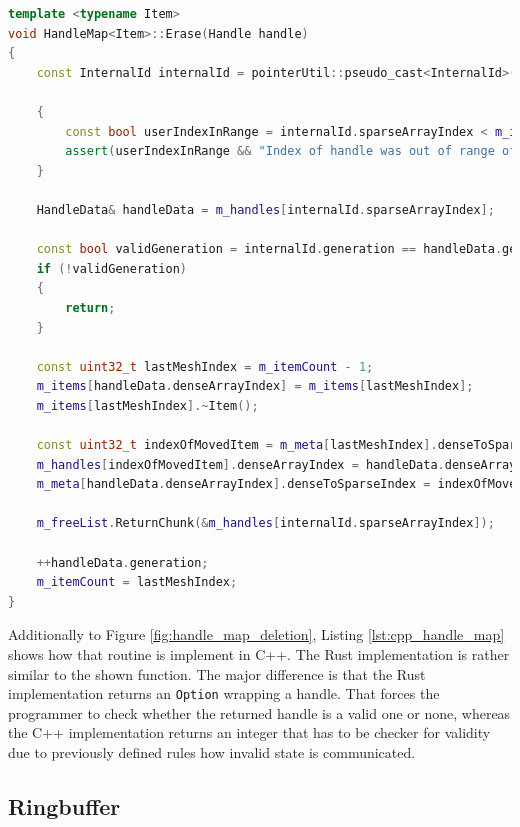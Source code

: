 \begin{lstlisting}[caption={Deletion of an item in the C++ implementation of the handle map}, label={lst:cpp_handle_map}, language={C++}]
template <typename Item>
void HandleMap<Item>::Erase(Handle handle)
{
	const InternalId internalId = pointerUtil::pseudo_cast<InternalId>(handle, 0);
	
	{
		const bool userIndexInRange = internalId.sparseArrayIndex < m_itemCount;
		assert(userIndexInRange && "Index of handle was out of range of the handle array");
	}
	
	HandleData& handleData = m_handles[internalId.sparseArrayIndex];
	
	const bool validGeneration = internalId.generation == handleData.generation;
	if (!validGeneration)
	{
		return;
	}
	
	const uint32_t lastMeshIndex = m_itemCount - 1;
	m_items[handleData.denseArrayIndex] = m_items[lastMeshIndex];
	m_items[lastMeshIndex].~Item();
	
	const uint32_t indexOfMovedItem = m_meta[lastMeshIndex].denseToSparseIndex;
	m_handles[indexOfMovedItem].denseArrayIndex = handleData.denseArrayIndex;
	m_meta[handleData.denseArrayIndex].denseToSparseIndex = indexOfMovedItem;
	
	m_freeList.ReturnChunk(&m_handles[internalId.sparseArrayIndex]);
	
	++handleData.generation;
	m_itemCount = lastMeshIndex;
}
\end{lstlisting}

\noindent
Additionally to Figure \ref{fig:handle_map_deletion}, Listing \ref{lst:cpp_handle_map} shows how that routine is implement in C++. The Rust implementation is rather similar to the shown function. The major difference is that the Rust implementation returns an \texttt{Option} wrapping a handle. That forces the programmer to check whether the returned handle is a valid one or none, whereas the C++ implementation returns an integer that has to be checker for validity due to previously defined rules how invalid state is communicated.

\subsection{Ringbuffer}


